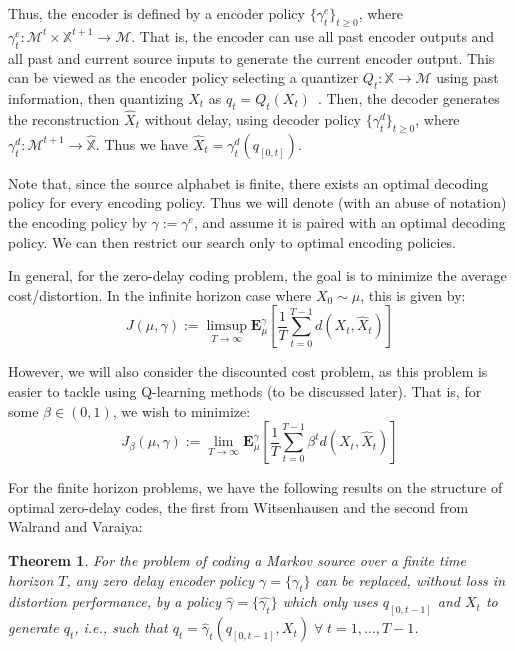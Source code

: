 \documentclass{article}
\newtheorem{theorem}{Theorem}[section]
\begin{document}
Thus, the encoder is defined by a encoder policy \( \{\gamma^e_t\}_{t \ge 0} \), where \( \gamma^e_t : \mathcal{M}^t \times \mathbb{X}^{t+1} \to \mathcal{M} \). That is, the encoder can use all past encoder outputs and all past and current source inputs to generate the current encoder output. This can be viewed as the encoder policy selecting a quantizer \( Q_t : \mathbb{X} \to \mathcal{M} \) using past information, then quantizing \( X_t \) as \( q_t = Q_t(X_t) \)~\cite{Linder}. Then, the decoder generates the reconstruction \( \hat{X}_t \) without delay, using decoder policy \( \{\gamma^d_t\}_{t \ge 0} \), where \( \gamma^d_t : \mathcal{M}^{t+1} \to \hat{\mathbb{X}} \). Thus we have \( \hat{X}_t = \gamma^d_t(q_{[0,t]}) \).

Note that, since the source alphabet is finite, there exists an optimal decoding policy for every encoding policy. Thus we will denote (with an abuse of notation) the encoding policy by \( \gamma := \gamma^e \), and assume it is paired with an optimal decoding policy. We can then restrict our search only to optimal encoding policies.

In general, for the zero-delay coding problem, the goal is to minimize the average cost/distortion. In the infinite horizon case where \( X_0 \sim \mu \), this is given by: %
\[ J(\mu, \gamma) := \limsup_{T\to\infty}\mathbf{E}_{\mu}^{\gamma}\left[\frac{1}{T}\sum_{t=0}^{T-1}d(X_t,\hat{X}_t)\right]\label{eq:average_cost} \]

However, we will also consider the discounted cost problem, as this problem is easier to tackle using Q-learning methods (to be discussed later). That is, for some \( \beta \in (0,1) \), we wish to minimize:
\[ J_{\beta}(\mu, \gamma) := \lim_{T\to\infty}\mathbf{E}_{\mu}^{\gamma}\left[\frac{1}{T}\sum_{t=0}^{T-1}\beta^t d(X_t,\hat{X}_t)\right]\label{eq:discounted_cost} \]

For the finite horizon problems, we have the following results on the structure of optimal zero-delay codes, the first from Witsenhausen and the second from Walrand and Varaiya:

\begin{theorem}\cite{Witsenhausen}
    For the problem of coding a Markov source over a finite time horizon \(T\), any zero delay encoder policy \(\gamma=\{\gamma_t\}\) can be replaced, without loss in distortion performance, by a policy \(\hat{\gamma}=\{\hat{\gamma_t}\}\) which only uses \(q_{[0,t-1]}\) and \(X_t\) to generate \(q_t\), i.e., such that \(q_t = \hat{\gamma}_t(q_{[0,t-1]}, X_t) \; \forall \; t = 1,\ldots,T-1\).
\end{theorem}
\end{document}
